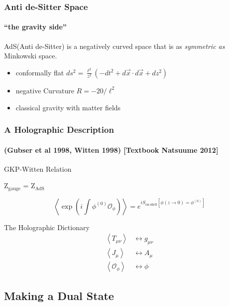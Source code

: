 \documentclass[xcolor=dvipsnames]{beamer}
\begin{document}
\begin{frame}
  \frametitle{Anti de-Sitter Space}
  \framesubtitle{``the gravity side''}

  \begin{block}{}
    \alert{AdS}(Anti de-Sitter) is a negatively curved space that is as \textit{symmetric as} Minkowski space.
  \end{block}

  \begin{itemize}
    \item conformally flat 
      $ds^2 = \frac {\ell^2}{z^2} \left( -dt^2 + d\vec x\cdot d\vec x + dz^2 \right)$
    \item negative Curvature 
      $R = -20/\ell^2$
    \item classical gravity with matter fields
  \end{itemize}

\end{frame}


\begin{frame}
  \frametitle{A Holographic Description }
  \framesubtitle{(Gubser et al 1998, Witten 1998) [Textbook Natsuume 2012]}
  \begin{block}{GKP-Witten Relation}
    \begin{center}Z$_\text{gauge}$ = Z$_\text{AdS}$\end{center}
    $$\left\langle \exp\left(i\int\phi^{(0)} \mathcal O_\phi\right) \right\rangle =  e^{i S_\text{on-shell}[\phi(z\rightarrow0) = \phi^{(0)}]}$$
  \end{block}

  \begin{block}{The Holographic Dictionary}
    \begin{align*}
      \left\langle T_{\mu\nu}\right\rangle &\longleftrightarrow g_{\mu\nu}\\
      \left\langle J_{\mu}\right\rangle &\longleftrightarrow A_{\mu}\\
      \left\langle\mathcal O_\phi\right\rangle &\longleftrightarrow \phi
    \end{align*}
  \end{block}


\end{frame}

\subsection{Making a Dual State}
\end{document}
